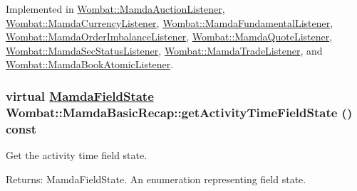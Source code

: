 Implemented in \hyperlink{classWombat_1_1MamdaAuctionListener_1e1e7f267e1681fe0edddd1a9748bc9e}{Wombat::Mamda\-Auction\-Listener}, \hyperlink{classWombat_1_1MamdaCurrencyListener_3d35c47919af62b2900d2c560b66d898}{Wombat::Mamda\-Currency\-Listener}, \hyperlink{classWombat_1_1MamdaFundamentalListener_b8d6e8e722a1654997c23f23a1ca4455}{Wombat::Mamda\-Fundamental\-Listener}, \hyperlink{classWombat_1_1MamdaOrderImbalanceListener_f6441d47955f9cf7d8572a7c6e2816d3}{Wombat::Mamda\-Order\-Imbalance\-Listener}, \hyperlink{classWombat_1_1MamdaQuoteListener_367521366aaadbe118e70ab32508d7c4}{Wombat::Mamda\-Quote\-Listener}, \hyperlink{classWombat_1_1MamdaSecStatusListener_e68b03d56c3402e337a06b63ef5566d1}{Wombat::Mamda\-Sec\-Status\-Listener}, \hyperlink{classWombat_1_1MamdaTradeListener_6262a8a8952d505d580832d5f7bec078}{Wombat::Mamda\-Trade\-Listener}, and \hyperlink{classWombat_1_1MamdaBookAtomicListener_84a6cb534ed359f19138a48d9f1f2812}{Wombat::Mamda\-Book\-Atomic\-Listener}.\hypertarget{classWombat_1_1MamdaBasicRecap_04f4a3a041dfc66f733b6c7288b390ac}{
\subsubsection[getActivityTimeFieldState]{\setlength{\rightskip}{0pt plus 5cm}virtual \hyperlink{namespaceWombat_93aac974f2ab713554fd12a1fa3b7d2a}{Mamda\-Field\-State} Wombat::Mamda\-Basic\-Recap::get\-Activity\-Time\-Field\-State () const}}
\label{classWombat_1_1MamdaBasicRecap_04f4a3a041dfc66f733b6c7288b390ac}


Get the activity time field state. 

\begin{Desc}
\item[Returns:]Mamda\-Field\-State. An enumeration representing field state. \end{Desc}


